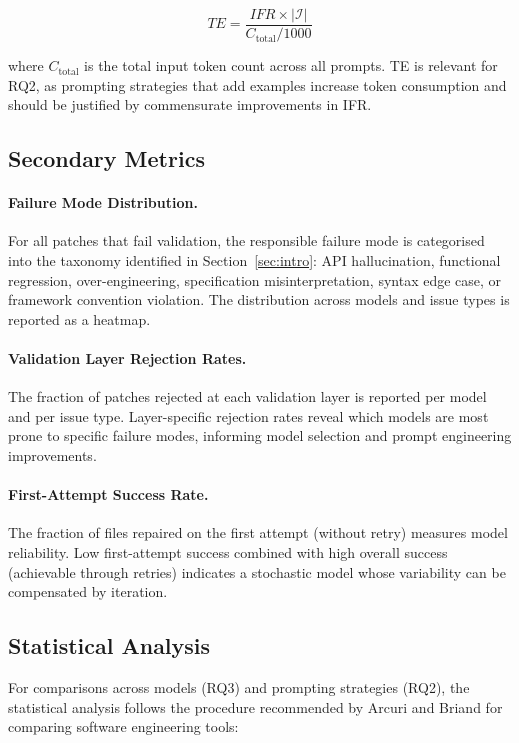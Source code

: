 \begin{equation}
  TE = \frac{IFR \times |\mathcal{I}|}{C_{\text{total}} / 1000}
  \label{eq:te}
\end{equation}

\noindent
where $C_{\text{total}}$ is the total input token count across all prompts.
TE is relevant for RQ2, as prompting strategies that add examples increase
token consumption and should be justified by commensurate improvements in IFR.

\subsection{Secondary Metrics}

\paragraph{Failure Mode Distribution.}
For all patches that fail validation, the responsible failure mode is
categorised into the taxonomy identified in Section~\ref{sec:intro}:
API hallucination, functional regression, over-engineering, specification
misinterpretation, syntax edge case, or framework convention violation.
The distribution across models and issue types is reported as a heatmap.

\paragraph{Validation Layer Rejection Rates.}
The fraction of patches rejected at each validation layer is reported per
model and per issue type.  Layer-specific rejection rates reveal which
models are most prone to specific failure modes, informing model selection
and prompt engineering improvements.

\paragraph{First-Attempt Success Rate.}
The fraction of files repaired on the first attempt (without retry) measures
model reliability.  Low first-attempt success combined with high overall
success (achievable through retries) indicates a stochastic model whose
variability can be compensated by iteration.

\subsection{Statistical Analysis}

For comparisons across models (RQ3) and prompting strategies (RQ2), the
statistical analysis follows the procedure recommended by Arcuri and Briand
\cite{arcuri2014} for comparing software engineering tools:

